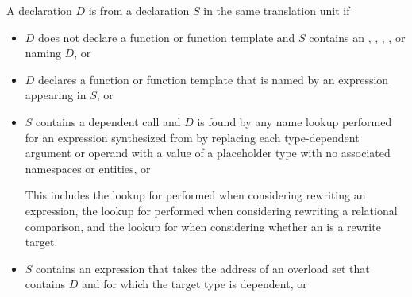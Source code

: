 \pnum
A declaration $D$ is  from a declaration $S$
in the same translation unit if
\begin{itemize}
\item
$D$ does not declare a function or function template and
$S$ contains an
,
,
,
, or
naming $D$, or

\item
$D$ declares a function or function template that
is named by an expression
appearing in $S$, or

\item
$S$ contains a dependent call 
and $D$ is found by any name lookup performed
for an expression synthesized from 
by replacing each type-dependent argument or operand
with a value of a placeholder type
with no associated namespaces or entities, or
\begin{note}
This includes the lookup for  performed
when considering rewriting an \tcode{!=} expression,
the lookup for 
performed when considering rewriting a relational comparison, and
the lookup for 
when considering whether an  is a rewrite target.
\end{note}

\item
$S$ contains an expression that
takes the address of an overload set
that contains $D$ and
for which the target type is dependent, or


\end{itemize}
